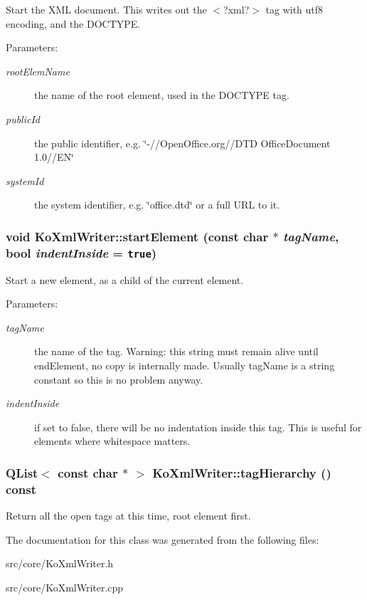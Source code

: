 Start the XML document. This writes out the $<$?xml?$>$ tag with utf8 encoding, and the DOCTYPE. \begin{Desc}
\item[Parameters:]
\begin{description}
\item[{\em rootElemName}]the name of the root element, used in the DOCTYPE tag. \item[{\em publicId}]the public identifier, e.g. \char`\"{}-//OpenOffice.org//DTD OfficeDocument 1.0//EN\char`\"{} \item[{\em systemId}]the system identifier, e.g. \char`\"{}office.dtd\char`\"{} or a full URL to it. \end{description}
\end{Desc}
\hypertarget{classKoXmlWriter_38a32e955d59b3e321914320ec4f2aea}{
\subsubsection[{startElement}]{\setlength{\rightskip}{0pt plus 5cm}void KoXmlWriter::startElement (const char $\ast$ {\em tagName}, \/  bool {\em indentInside} = {\tt true})}}
\label{classKoXmlWriter_38a32e955d59b3e321914320ec4f2aea}


Start a new element, as a child of the current element. \begin{Desc}
\item[Parameters:]
\begin{description}
\item[{\em tagName}]the name of the tag. Warning: this string must remain alive until endElement, no copy is internally made. Usually tagName is a string constant so this is no problem anyway. \item[{\em indentInside}]if set to false, there will be no indentation inside this tag. This is useful for elements where whitespace matters. \end{description}
\end{Desc}
\hypertarget{classKoXmlWriter_9b3c63f244bbf41882ea76215b1be287}{
\subsubsection[{tagHierarchy}]{\setlength{\rightskip}{0pt plus 5cm}QList$<$ const char $\ast$ $>$ KoXmlWriter::tagHierarchy () const}}
\label{classKoXmlWriter_9b3c63f244bbf41882ea76215b1be287}


Return all the open tags at this time, root element first. 

The documentation for this class was generated from the following files:\begin{CompactItemize}
\item 
src/core/KoXmlWriter.h\item 
src/core/KoXmlWriter.cpp\end{CompactItemize}
